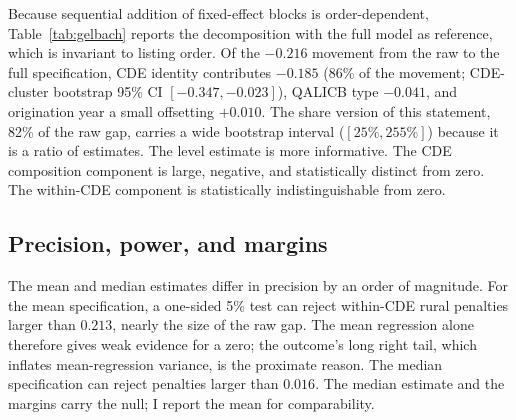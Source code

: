Because sequential addition of fixed-effect blocks is order-dependent,
Table~\ref{tab:gelbach} reports the \citet{gelbach2016} decomposition
with the full model as reference, which is invariant to listing order. Of
the $-0.216$ movement from the raw to the full specification, CDE identity
contributes $-0.185$ (86\% of the movement; CDE-cluster bootstrap 95\% CI
$[-0.347, -0.023]$), QALICB type $-0.041$, and origination year a small
offsetting $+0.010$. The share version of this statement, 82\% of the raw
gap, carries a wide bootstrap interval ($[25\%, 255\%]$) because it is a
ratio of estimates. The level estimate is more informative. The CDE
composition component is large, negative, and statistically distinct from
zero. The within-CDE component is statistically indistinguishable from
zero.


\begin{table}[t]
\centering
\caption{The rural leverage gap under layered fixed effects. Outcome:
project leverage, winsorized $[1,20]$. Columns (1)--(4) report HC1 standard errors; columns
(5) and (7) cluster at the CDE level; column (6) reports the
quantile-regression asymptotic standard error, which is not clustered.
$^{***}p<0.01$, $^{**}p<0.05$, $^{*}p<0.10$.}
\label{tab:main}

\end{table}

\begin{table}[t]
\centering
\caption{Gelbach (order-invariant) decomposition of the raw rural gap,
full-model reference. Contributions sum to
$\hat\beta_{M0} - \hat\beta_{\mathrm{full}}$ by identity (verified to
$10^{-14}$ in the replication code).}
\label{tab:gelbach}

\end{table}

\subsection{Precision, power, and margins}\label{sec:power}

The mean and median estimates differ in precision by an order of magnitude.
For the mean
specification, a one-sided 5\% test can reject within-CDE rural penalties
larger than $0.213$, nearly the size of the raw gap. The mean regression
alone therefore gives weak evidence for a zero; the outcome's long right
tail, which inflates mean-regression variance, is the proximate reason.
The median specification can reject penalties larger than $0.016$. The
median estimate and the margins carry the null; I report the mean for
comparability.

